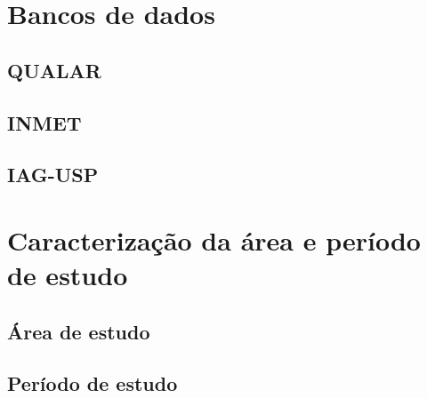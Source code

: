 \chapter{Bancos de dados}

\lipsum[21]

\section{QUALAR}

\lipsum[21-22]

\section{INMET}

\lipsum[24-25]

\section{IAG-USP}

\lipsum[24-25]

\chapter{Caracterização da área e período de estudo}

\section{Área de estudo}

\lipsum[21-22]

\section{Período de estudo}

\lipsum[24-25]